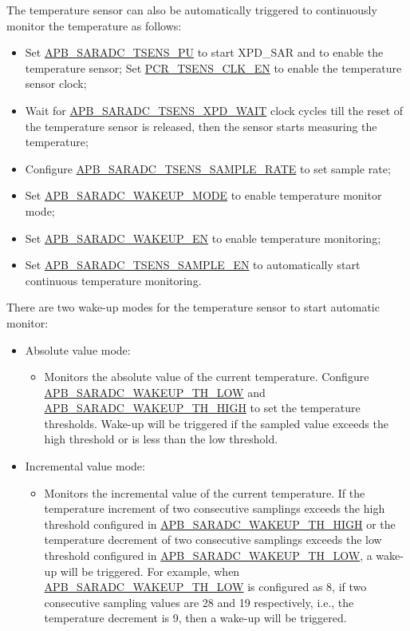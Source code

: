 \documentclass[main\_\_EN.tex]{subfiles}
\begin{document}
The temperature sensor can also be automatically triggered to continuously monitor the temperature as follows:
    \begin{itemize}
        \item Set \hyperref[fielddesc:APBSARADCTSENSPU]{APB\_SARADC\_TSENS\_PU} to start XPD\_SAR and to enable the temperature sensor; Set \hyperref[fielddesc:PCRTSENSCLKEN]{PCR\_TSENS\_CLK\_EN} to enable the temperature sensor clock;
        \item Wait for \hyperref[fielddesc:APBSARADCTSENSXPDWAIT]{APB\_SARADC\_TSENS\_XPD\_WAIT} clock cycles till the reset of the temperature sensor is released, then the sensor starts measuring the temperature;
        \item Configure \hyperref[fielddesc:APBSARADCTSENSSAMPLERATE]{APB\_SARADC\_TSENS\_SAMPLE\_RATE} to set sample rate;
        \item Set \hyperref[fielddesc:APBSARADCWAKEUPMODE]{APB\_SARADC\_WAKEUP\_MODE} to enable temperature monitor mode;
        \item Set \hyperref[fielddesc:APBSARADCWAKEUPEN]{APB\_SARADC\_WAKEUP\_EN} to enable temperature monitoring;
        \item Set \hyperref[fielddesc:APBSARADCTSENSSAMPLEEN]{APB\_SARADC\_TSENS\_SAMPLE\_EN} to automatically start continuous temperature monitoring.
    \end{itemize}

There are two wake-up modes for the temperature sensor to start automatic monitor:
   \begin{itemize}
       \item Absolute value mode:
           \begin{itemize}
                \item Monitors the absolute value of the current temperature. Configure \hyperref[fielddesc:APBSARADCWAKEUPTHLOW]{APB\_SARADC\_WAKEUP\_TH\_LOW} and \hyperref[fielddesc:APBSARADCWAKEUPTHHIGH]{APB\_SARADC\_WAKEUP\_TH\_HIGH} to set the temperature thresholds. Wake-up will be triggered if the sampled value exceeds the high threshold or is less than the low threshold. 
           \end{itemize}
       \item Incremental value mode:
            \begin{itemize}
                \item Monitors the incremental value of the current temperature. If the temperature increment of two consecutive samplings exceeds the high threshold configured in \hyperref[fielddesc:APBSARADCWAKEUPTHHIGH]{APB\_SARADC\_WAKEUP\_TH\_HIGH} or the temperature decrement of two consecutive samplings exceeds the low threshold configured in \hyperref[fielddesc:APBSARADCWAKEUPTHLOW]{APB\_SARADC\_WAKEUP\_TH\_LOW}, a wake-up will be triggered. For example, when \hyperref[fielddesc:APBSARADCWAKEUPTHLOW]{APB\_SARADC\_WAKEUP\_TH\_LOW} is configured as 8, if two consecutive sampling values are 28 and 19 respectively, i.e., the temperature decrement is 9, then a wake-up will be triggered.
            \end{itemize}
    \end{itemize}
\end{document}
